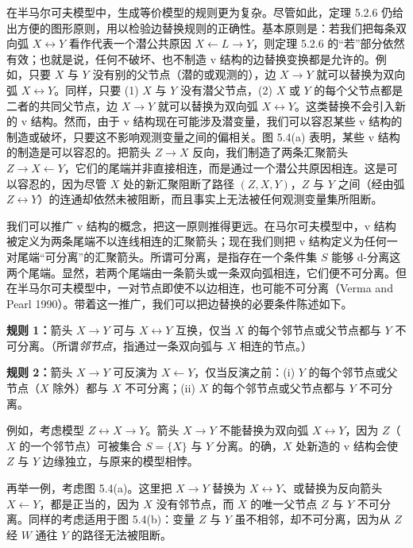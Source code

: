 在半马尔可夫模型中，生成等价模型的规则更为复杂。尽管如此，定理 5.2.6 仍给出方便的图形原则，用以检验边替换规则的正确性。基本原则是：若我们把每条双向弧 $X\longleftrightarrow Y$ 看作代表一个潜公共原因 $X\leftarrow L\rightarrow Y$，则定理 5.2.6 的“若”部分依然有效；也就是说，任何不破坏、也不制造 v 结构的边替换变换都是允许的。例如，只要 $X$ 与 $Y$ 没有别的父节点（潜的或观测的），边 $X\to Y$ 就可以替换为双向弧 $X\longleftrightarrow Y$。同样，只要 (1) $X$ 与 $Y$ 没有潜父节点，(2) $X$ 或 $Y$ 的每个父节点都是二者的共同父节点，边 $X\to Y$ 就可以替换为双向弧 $X\longleftrightarrow Y$。这类替换不会引入新的 v 结构。然而，由于 v 结构现在可能涉及潜变量，我们可以容忍某些 v 结构的制造或破坏，只要这不影响观测变量之间的偏相关。图 5.4(a) 表明，某些 v 结构的制造是可以容忍的。把箭头 $Z\to X$ 反向，我们制造了两条汇聚箭头 $Z\rightarrow X\leftarrow Y$，它们的尾端并非直接相连，而是通过一个潜公共原因相连。这是可以容忍的，因为尽管 $X$ 处的新汇聚阻断了路径 $(Z,X,Y)$，$Z$ 与 $Y$ 之间（经由弧 $Z\longleftrightarrow Y$）的连通却依然未被阻断，而且事实上无法被任何观测变量集所阻断。

我们可以推广 v 结构的概念，把这一原则推得更远。在马尔可夫模型中，v 结构被定义为两条尾端不以连线相连的汇聚箭头；现在我们则把 v 结构定义为任何一对尾端“可分离”的汇聚箭头。所谓可分离，是指存在一个条件集 $S$ 能够 d-分离这两个尾端。显然，若两个尾端由一条箭头或一条双向弧相连，它们便不可分离。但在半马尔可夫模型中，一对节点即使不以边相连，也可能不可分离（Verma and Pearl 1990）。带着这一推广，我们可以把边替换的必要条件陈述如下。

\noindent\textbf{规则 1：}箭头 $X\to Y$ 可与 $X\longleftrightarrow Y$ 互换，仅当 $X$ 的每个邻节点或父节点都与 $Y$ 不可分离。（所谓\emph{邻节点}，指通过一条双向弧与 $X$ 相连的节点。）

\smallskip
\noindent\textbf{规则 2：}箭头 $X\to Y$ 可反演为 $X\leftarrow Y$，仅当反演之前：(i) $Y$ 的每个邻节点或父节点（$X$ 除外）都与 $X$ 不可分离；(ii) $X$ 的每个邻节点或父节点都与 $Y$ 不可分离。

例如，考虑模型 $Z\longleftrightarrow X\to Y$。箭头 $X\to Y$ 不能替换为双向弧 $X\longleftrightarrow Y$，因为 $Z$（$X$ 的一个邻节点）可被集合 $S=\{X\}$ 与 $Y$ 分离。的确，$X$ 处新造的 v 结构会使 $Z$ 与 $Y$ 边缘独立，与原来的模型相悖。

再举一例，考虑图 5.4(a)。这里把 $X\to Y$ 替换为 $X\longleftrightarrow Y$、或替换为反向箭头 $X\leftarrow Y$，都是正当的，因为 $X$ 没有邻节点，而 $X$ 的唯一父节点 $Z$ 与 $Y$ 不可分离。同样的考虑适用于图 5.4(b)：变量 $Z$ 与 $Y$ 虽不相邻，却不可分离，因为从 $Z$ 经 $W$ 通往 $Y$ 的路径无法被阻断。

